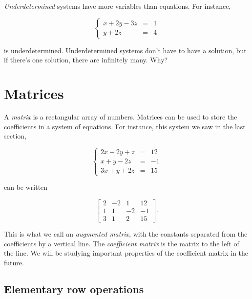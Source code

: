 \documentclass[
]{book}
\theoremstyle{definition}
\theoremstyle{definition}
\theoremstyle{definition}
\theoremstyle{definition}
\theoremstyle{remark}
\begin{document}
\emph{Underdetermined} systems have more variables than equations. For instance,

\begin{equation*}
    \left\{ \begin{array}{rcl}
    x+2y-3z&=&1\\
    y+2z&=&4 \end{array} \right. 
\end{equation*}

is underdetermined. Underdetermined systems don't have to have a solution, but if there's one solution, there are infinitely many. Why?

\section{Matrices}\label{matrices}

A \emph{matrix} is a rectangular array of numbers. Matrices can be used to store the coefficients in a system of equations. For instance, this system we saw in the last section,

\begin{equation*}
\left\{ 
\begin{array}{rcl}
2x-2y+z&=&12\\
    x+y-2z&=&-1\\
    3x+y+2z&=&15
\end{array}\right. 
\end{equation*}

can be written

\[\left[\begin{array}{rrr|r}
2&-2&1&12\\
1 & 1 & -2 & -1\\
3 & 1 & 2 & 15
\end{array}\right].\]

This is what we call an \emph{augmented matrix}, with the constants separated from the coefficients by a vertical line. The \emph{coefficient matrix} is the matrix to the left of the line. We will be studying important properties of the coefficient matrix in the future.

\subsection*{Elementary row operations}\label{elementary-row-operations}
\end{document}
